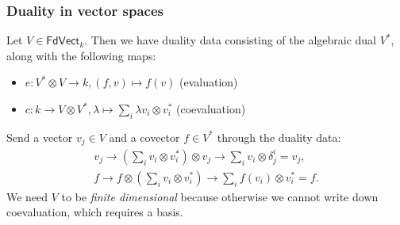 \documentclass[xcolor=dvipsnames]{beamer}
\begin{document}
\begin{frame}
\frametitle{Duality in vector spaces} 
    \begin{example}
        Let $V \in \mathsf{FdVect} _k$. Then we have duality data consisting of the algebraic dual $V^*$, along with the following maps:
        \begin{itemize}
    \item $e \colon V^* \otimes V \to k, (f,v) \mapsto  f(v)$ (evaluation)
    \item $c \colon k \to V \otimes V^*, \lambda \mapsto \sum_i  \lambda v_i  \otimes v_i ^* $ (coevaluation)
        \end{itemize}
        Send a vector  $v_j  \in V$ and a covector $f\in  V^*$ through the duality data:
 \begin{gather*}
     v_j  \to \left( \sum _i  v_i  \otimes v_i ^* \right) \otimes v_j \to \sum _i  v_i \otimes \delta ^i _j =v_j ,\\
     f \to f\otimes \left( \sum _i  v_i  \otimes v_i ^* \right) \to \sum _i  f(v_i )\otimes v_i ^*=f.
 \end{gather*}
 We need $V$ to be \emph{finite dimensional}  because otherwise we cannot write down coevaluation, which requires a basis.

    \end{example}
\end{frame}
\endgroup
\end{document}

